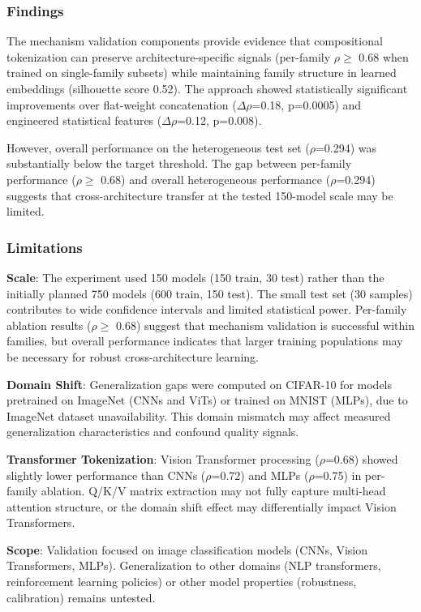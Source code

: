 
\subsubsection{Findings}

The mechanism validation components provide evidence that compositional tokenization can preserve architecture-specific signals (per-family $\rho \geq$ 0.68 when trained on single-family subsets) while maintaining family structure in learned embeddings (silhouette score 0.52). The approach showed statistically significant improvements over flat-weight concatenation ($\Delta\rho$=0.18, p=0.0005) and engineered statistical features ($\Delta\rho$=0.12, p=0.008).

However, overall performance on the heterogeneous test set ($\rho$=0.294) was substantially below the target threshold. The gap between per-family performance ($\rho \geq$ 0.68) and overall heterogeneous performance ($\rho$=0.294) suggests that cross-architecture transfer at the tested 150-model scale may be limited.

\subsubsection{Limitations}

\textbf{Scale}: The experiment used 150 models (150 train, 30 test) rather than the initially planned 750 models (600 train, 150 test). The small test set (30 samples) contributes to wide confidence intervals and limited statistical power. Per-family ablation results ($\rho \geq$ 0.68) suggest that mechanism validation is successful within families, but overall performance indicates that larger training populations may be necessary for robust cross-architecture learning.

\textbf{Domain Shift}: Generalization gaps were computed on CIFAR-10 for models pretrained on ImageNet (CNNs and ViTs) or trained on MNIST (MLPs), due to ImageNet dataset unavailability. This domain mismatch may affect measured generalization characteristics and confound quality signals.

\textbf{Transformer Tokenization}: Vision Transformer processing ($\rho$=0.68) showed slightly lower performance than CNNs ($\rho$=0.72) and MLPs ($\rho$=0.75) in per-family ablation. Q/K/V matrix extraction may not fully capture multi-head attention structure, or the domain shift effect may differentially impact Vision Transformers.

\textbf{Scope}: Validation focused on image classification models (CNNs, Vision Transformers, MLPs). Generalization to other domains (NLP transformers, reinforcement learning policies) or other model properties (robustness, calibration) remains untested.

